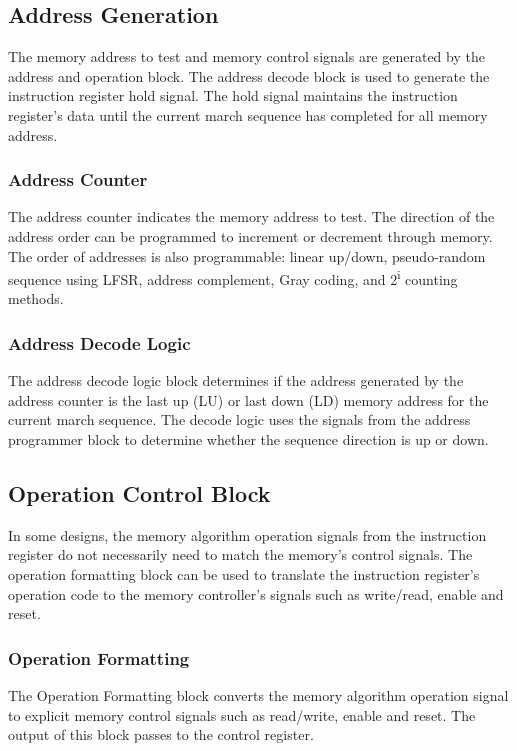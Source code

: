 \subsection{Address Generation}
The memory address to test and memory control signals are generated by the address and operation block.  The address decode block is used to generate the instruction register hold signal.  The hold signal maintains the instruction register's data until the current march sequence has completed for all memory address.  

\subsubsection{Address Counter}
The address counter indicates the memory address to test.  The direction of the address order can be programmed to increment or decrement through memory.  The order of addresses is also programmable: linear up/down, pseudo-random sequence using LFSR, address complement, Gray coding, and 2\textsuperscript{i} counting methods.
 
\subsubsection{Address Decode Logic}
The address decode logic block determines if the address generated by the address counter is the last up (LU) or last down (LD) memory address for the current march sequence.  The decode logic uses the signals from the address programmer block to determine whether the sequence direction is up or down.   

\subsection{Operation Control Block}
In some designs, the memory algorithm operation signals from the instruction register do not necessarily need to match the memory's control signals.  The operation formatting block can be used to translate the instruction register's operation code to the memory controller's signals such as write/read, enable and reset.

\subsubsection{Operation Formatting}
The Operation Formatting block converts the memory algorithm operation signal to explicit memory control signals such as read/write, enable and reset.  The output of this block passes to the control register.

